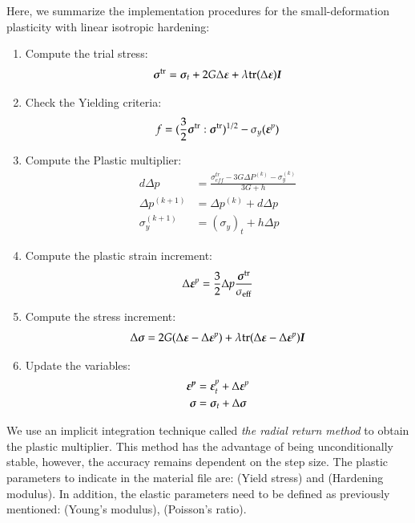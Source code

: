 Here, we summarize the implementation procedures for the
small-deformation plasticity with linear isotropic hardening:
\begin{enumerate}
\item Compute the trial stress:
  \begin{equation}
    {\ensuremath{\boldsymbol{\sigma}}}^{{\mathrm{tr}}} = {\boldsymbol{\sigma}}_t + 2G\Delta \boldsymbol{\varepsilon} + \lambda \mathrm{tr}(\Delta \boldsymbol{\varepsilon})\boldsymbol{I}
  \end{equation}
\item Check the Yielding criteria:
  \begin{equation}
    f = (\frac{3}{2} {\boldsymbol{\sigma}}^{{\mathrm{tr}}} : {\boldsymbol{\sigma}}^{{\mathrm{tr}}})^{1/2}-\sigma_y (\boldsymbol{\varepsilon}^p)
  \end{equation}
\item Compute the Plastic multiplier:
  \begin{align}
    d \Delta p &= \frac{\sigma^{tr}_{eff} - 3G \Delta P^{(k)}- \sigma_y^{(k)}}{3G + h}\\
    \Delta p^{(k+1)} &= \Delta p^{(k)}+ d\Delta p\\
    \sigma_y^{(k+1)} &= (\sigma_y)_t+ h\Delta p
  \end{align}
\item Compute the plastic strain increment:
  \begin{equation}
    \Delta {\ensuremath{\boldsymbol{\varepsilon}}}^p = \frac{3}{2} \Delta p \frac{{\boldsymbol{\sigma}}^{{\mathrm{tr}}}}{\sigma_{{\mathrm{eff}}}}
  \end{equation}
\item Compute the stress increment:
  \begin{equation}
    {\Delta \ensuremath{\boldsymbol{\sigma}}} = 2G(\Delta \boldsymbol{\varepsilon}-\Delta \boldsymbol{\varepsilon}^p) + \lambda  \mathrm{tr}(\Delta \boldsymbol{\varepsilon}-\Delta \boldsymbol{\varepsilon}^p)\boldsymbol{I}
  \end{equation}
\item Update the variables:
  \begin{align}
    {\ensuremath{\boldsymbol{\varepsilon^p}}} &= {\boldsymbol{\varepsilon}}^p_t+{\Delta {\ensuremath{\boldsymbol{\varepsilon}}}^p}\\
    {\boldsymbol{\sigma}} &= {\boldsymbol{\sigma}}_t+{\Delta \boldsymbol{\sigma}}
  \end{align}
\end{enumerate}

We use an implicit integration technique called \emph{the radial
  return method} to obtain the plastic multiplier. This method has the
advantage of being unconditionally stable, however, the accuracy
remains dependent on the step size. The plastic parameters to indicate
in the material file are:  (Yield stress) and
 (Hardening modulus). In addition, the elastic parameters need
to be defined as previously mentioned:  (Young's modulus),
 (Poisson's ratio).


